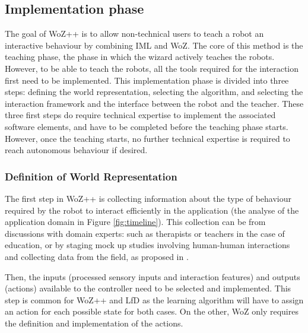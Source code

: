 \documentclass[manuscript, review, anonymous]{acmart}
\newcommand{\ES}[1]{\added[id=ES]{#1}}
\newcommand{\woz}{WoZ++\xspace}
\begin{document}
\subsection{Implementation phase}

The goal of \woz is to allow non-technical users to teach a robot an interactive
behaviour by combining IML and WoZ. The core of this method is the teaching
phase, the phase in which the wizard actively teaches the robots. However, to be
able to teach the robots, all the tools required for the interaction first need to be implemented. This implementation phase is divided into three steps: defining the
world representation, selecting the algorithm, and selecting the interaction
framework and the interface between the robot and the teacher. These three
first steps do require technical expertise to implement the associated software
elements, and have to be completed before the teaching phase starts. However,
once the teaching starts, no further technical expertise is required to reach
autonomous behaviour if desired.



\subsubsection{Definition of World Representation}

The first step in \woz is collecting information about the type of behaviour
required by the robot to interact efficiently in the application (the analyse of the application domain in Figure \ref{fig:timeline}). This
collection can be from discussions with domain experts: such as therapists or
teachers in the case of education, or by staging mock up studies involving
human-human interactions and collecting data from the field, as proposed in
\cite{sequeira2016discovering}.

Then, the inputs (processed sensory inputs and interaction features) and outputs
(actions) available to the controller need to be selected and implemented. This
step is common for \woz and LfD as the learning algorithm will have to assign an
action for each possible state for both cases.  On the other, WoZ only requires
the definition and implementation of the actions.
\end{document}
